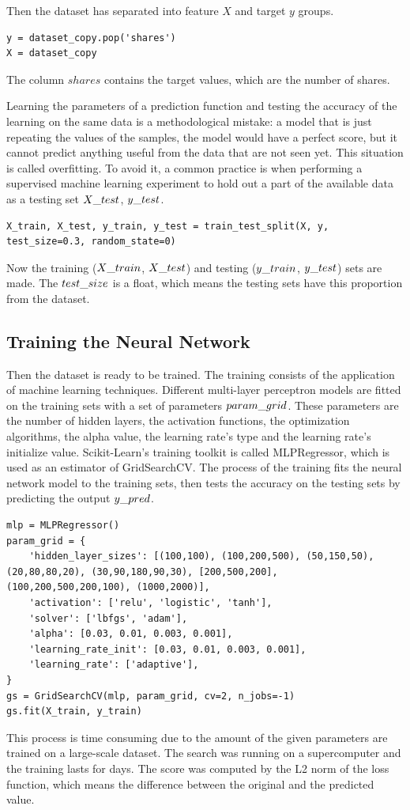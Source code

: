 \noindent Then the dataset has separated into feature $X$ and target $y$ groups.
\begin{lstlisting}
y = dataset_copy.pop('shares')
X = dataset_copy
\end{lstlisting}
The column $shares$ contains the target values, which are the number of shares.\medskip

Learning the parameters of a prediction function and testing the accuracy of the learning on the same data is a methodological mistake: a model that is just repeating the values of the samples, the model would have a perfect score, but it cannot predict anything useful from the data that are not seen yet. This situation is called overfitting. To avoid it, a common practice is when performing a supervised machine learning experiment to hold out a part of the available data as a testing set $X\char`_test$, $y\char`_test$. 
\begin{lstlisting}
X_train, X_test, y_train, y_test = train_test_split(X, y, test_size=0.3, random_state=0)
\end{lstlisting}
Now the training ($X\char`_train$, $X\char`_test$) and testing ($y\char`_train$, $y\char`_test$) sets are made. The $test\char`_size$ is a float, which means the testing sets have this proportion from the dataset.



\subsection{Training the Neural Network}

Then the dataset is ready to be trained. The training consists of the application of machine learning techniques. Different multi-layer perceptron models are fitted on the training sets with a set of parameters $param\char`_grid$. These parameters are the number of hidden layers, the activation functions, the optimization algorithms, the alpha value, the learning rate's type and the learning rate's initialize value. Scikit-Learn's training toolkit is called MLPRegressor, which is used as an estimator of GridSearchCV. The process of the training fits the neural network model to the training sets, then tests the accuracy on the testing sets by predicting the output $y\char`_pred$.  
\begin{lstlisting}
mlp = MLPRegressor()
param_grid = {
	'hidden_layer_sizes': [(100,100), (100,200,500), (50,150,50), (20,80,80,20), (30,90,180,90,30), [200,500,200], (100,200,500,200,100), (1000,2000)],
	'activation': ['relu', 'logistic', 'tanh'],
	'solver': ['lbfgs', 'adam'],
	'alpha': [0.03, 0.01, 0.003, 0.001],
	'learning_rate_init': [0.03, 0.01, 0.003, 0.001],
	'learning_rate': ['adaptive'],
}
gs = GridSearchCV(mlp, param_grid, cv=2, n_jobs=-1)
gs.fit(X_train, y_train)
\end{lstlisting}
This process is time consuming due to the amount of the given parameters are trained on a large-scale dataset. The search was running on a supercomputer and  the training lasts for days. The score was computed by the L2 norm of the loss function, which means the difference between the original and the predicted value. \smallskip

